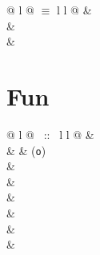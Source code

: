 \begin{isabellebody}
\begin{isamarkuptext}
\begin{supertabular}{@ {} l @ {\quad$\equiv$\quad} l l @ {}}
 & \\
 & \\
 & \\
\end{supertabular}


\section{Fun}

\begin{supertabular}{@ {} l @ {~::~} l l @ {}}
 & \\
 &  & (\texttt{o})\\
 & \\
 & \\
 & \\
 & \\
 & \\
 & \\
\end{supertabular}


\end{isamarkuptext}
\end{isabellebody}
